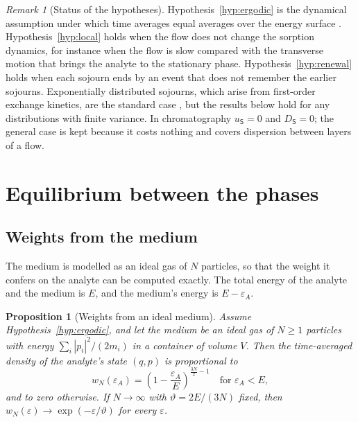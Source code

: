 \documentclass[11pt,a4paper]{article}
\newtheorem{proposition}[theorem]{Proposition}
\theoremstyle{definition}
\theoremstyle{remark}
\newtheorem{remark}[theorem]{Remark}
\newcommand{\Sta}{\mathsf{S}}
\begin{document}
\begin{remark}[Status of the hypotheses]
\label{rem:hyp-status}
Hypothesis~\ref{hyp:ergodic} is the dynamical assumption under which time averages equal averages over the energy surface \citep{birkhoff1931,walters1982}.
Hypothesis~\ref{hyp:local} holds when the flow does not change the sorption dynamics, for instance when the flow is slow compared with the transverse motion that brings the analyte to the stationary phase.
Hypothesis~\ref{hyp:renewal} holds when each sojourn ends by an event that does not remember the earlier sojourns.
Exponentially distributed sojourns, which arise from first-order exchange kinetics, are the standard case \citep{giddings1955}, but the results below hold for any distributions with finite variance.
In chromatography $u_\Sta=0$ and $D_\Sta=0$; the general case is kept because it costs nothing and covers dispersion between layers of a flow.
\end{remark}

\section{Equilibrium between the phases}
\label{sec:equilibrium}

\subsection{Weights from the medium}

The medium is modelled as an ideal gas of $N$ particles, so that the weight it confers on the analyte can be computed exactly.
The total energy of the analyte and the medium is $E$, and the medium's energy is $E-\varepsilon_A$.

\begin{proposition}[Weights from an ideal medium]
\label{prop:weights}
Assume Hypothesis~\ref{hyp:ergodic}, and let the medium be an ideal gas of $N\ge1$ particles with energy $\sum_i|p_i|^{2}/(2m_i)$ in a container of volume $V$.
Then the time-averaged density of the analyte's state $(q,p)$ is proportional to
\begin{equation}
w_N(\varepsilon_A)=\left(1-\frac{\varepsilon_A}{E}\right)^{\frac{3N}{2}-1}\quad\text{for }\varepsilon_A<E,
\label{eq:weight-finite}
\end{equation}
and to zero otherwise.
If $N\to\infty$ with $\vartheta=2E/(3N)$ fixed, then $w_N(\varepsilon)\to\exp(-\varepsilon/\vartheta)$ for every $\varepsilon$.
\end{proposition}
\end{document}
